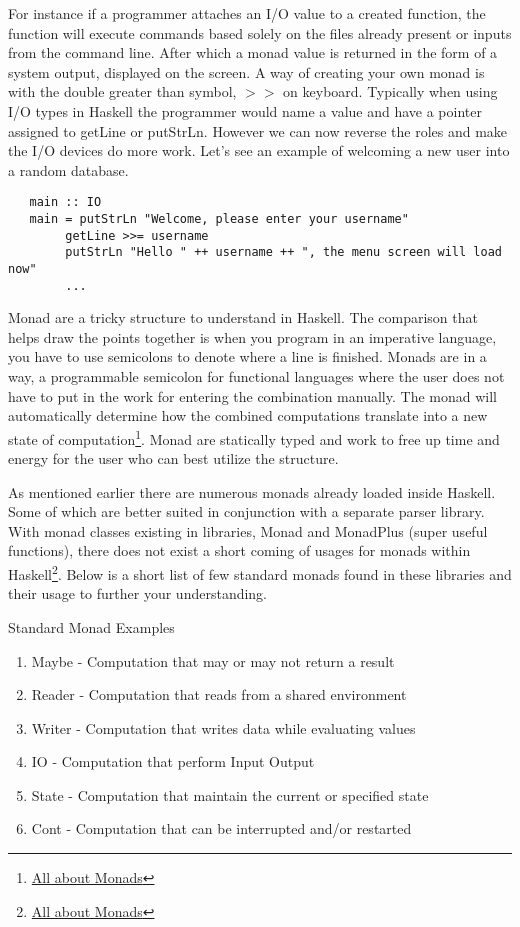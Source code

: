 \documentclass{article}
\begin{document}
\noindent For instance if a programmer attaches an I/O value to a created function, the function will execute commands based solely on the files already present or inputs from the command line. After which a monad value is returned in the form of a system output, displayed on the screen. A way of creating your own monad is with the double greater than symbol, $>>$ on keyboard. Typically when using I/O types in Haskell the programmer would name a value and have a pointer assigned to getLine or putStrLn. However we can now reverse the roles and make the I/O devices do more work. Let's see an example of welcoming a new user into a random database.

\begin{lstlisting}
   main :: IO
   main = putStrLn "Welcome, please enter your username"
        getLine >>= username
        putStrLn "Hello " ++ username ++ ", the menu screen will load now" 
        ...
\end{lstlisting}

\noindent Monad are a tricky structure to understand in Haskell. The comparison that helps draw the points together is when you program in an imperative language, you have to use semicolons to denote where a line is finished. Monads are in a way, a programmable semicolon for functional languages where the user does not have to put in the work for entering the combination manually. The monad will automatically determine how the combined computations translate into a new state of computation\footnote{\href{https://wiki.haskell.org/All_About_Monads}{All about Monads}}. Monad are statically typed and work to free up time and energy for the user who can best utilize the structure.

\medskip\noindent As mentioned earlier there are numerous monads already loaded inside Haskell. Some of which are better suited in conjunction with a separate parser library. With monad classes existing in libraries, Monad and MonadPlus (super useful functions), there does not exist a short coming of usages for monads within Haskell\footnote{\href{https://wiki.haskell.org/All_About_Monads}{All about Monads}}. Below is a short list of few standard monads found in these libraries and their usage to further your understanding.

\medskip
\caption{Standard Monad Examples}
\begin{enumerate}
    \item Maybe - Computation that may or may not return a result
    \item Reader - Computation that reads from a shared environment
    \item Writer - Computation that writes data while evaluating values
    \item IO - Computation that perform Input Output
    \item State - Computation that maintain the current or specified state
    \item Cont - Computation that can be interrupted and/or restarted
\end{enumerate}
\end{document}

